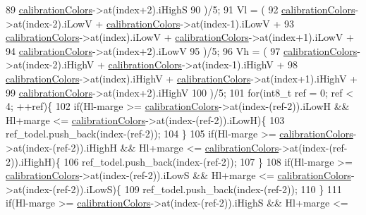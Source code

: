 \begin{DoxyCode}
89             \hyperlink{classCalibration_a062b450b8f24d5eadab562b3ed929f89}{calibrationColors}->at(index+2).iHighS
90         )/5;
91         Vl = (
92             \hyperlink{classCalibration_a062b450b8f24d5eadab562b3ed929f89}{calibrationColors}->at(index-2).iLowV + 
      \hyperlink{classCalibration_a062b450b8f24d5eadab562b3ed929f89}{calibrationColors}->at(index-1).iLowV + 
93             \hyperlink{classCalibration_a062b450b8f24d5eadab562b3ed929f89}{calibrationColors}->at(index).iLowV + 
      \hyperlink{classCalibration_a062b450b8f24d5eadab562b3ed929f89}{calibrationColors}->at(index+1).iLowV + 
94             \hyperlink{classCalibration_a062b450b8f24d5eadab562b3ed929f89}{calibrationColors}->at(index+2).iLowV
95         )/5;
96         Vh = (
97             \hyperlink{classCalibration_a062b450b8f24d5eadab562b3ed929f89}{calibrationColors}->at(index-2).iHighV + 
      \hyperlink{classCalibration_a062b450b8f24d5eadab562b3ed929f89}{calibrationColors}->at(index-1).iHighV + 
98             \hyperlink{classCalibration_a062b450b8f24d5eadab562b3ed929f89}{calibrationColors}->at(index).iHighV + 
      \hyperlink{classCalibration_a062b450b8f24d5eadab562b3ed929f89}{calibrationColors}->at(index+1).iHighV + 
99             \hyperlink{classCalibration_a062b450b8f24d5eadab562b3ed929f89}{calibrationColors}->at(index+2).iHighV
100         )/5;
101         \textcolor{keywordflow}{for}(int8\_t ref = 0; ref < 4; ++ref)\{
102             \textcolor{keywordflow}{if}(Hl-marge >= \hyperlink{classCalibration_a062b450b8f24d5eadab562b3ed929f89}{calibrationColors}->at(index-(ref-2)).iLowH && Hl+marge <= 
      \hyperlink{classCalibration_a062b450b8f24d5eadab562b3ed929f89}{calibrationColors}->at(index-(ref-2)).iLowH)\{
103                 ref\_todel.push\_back(index-(ref-2));
104             \}
105             \textcolor{keywordflow}{if}(Hl-marge >= \hyperlink{classCalibration_a062b450b8f24d5eadab562b3ed929f89}{calibrationColors}->at(index-(ref-2)).iHighH && Hl+marge <= 
      \hyperlink{classCalibration_a062b450b8f24d5eadab562b3ed929f89}{calibrationColors}->at(index-(ref-2)).iHighH)\{
106                 ref\_todel.push\_back(index-(ref-2));
107             \}
108             \textcolor{keywordflow}{if}(Hl-marge >= \hyperlink{classCalibration_a062b450b8f24d5eadab562b3ed929f89}{calibrationColors}->at(index-(ref-2)).iLowS && Hl+marge <= 
      \hyperlink{classCalibration_a062b450b8f24d5eadab562b3ed929f89}{calibrationColors}->at(index-(ref-2)).iLowS)\{
109                 ref\_todel.push\_back(index-(ref-2));
110             \}
111             \textcolor{keywordflow}{if}(Hl-marge >= \hyperlink{classCalibration_a062b450b8f24d5eadab562b3ed929f89}{calibrationColors}->at(index-(ref-2)).iHighS && Hl+marge <= 

\end{DoxyCode}
